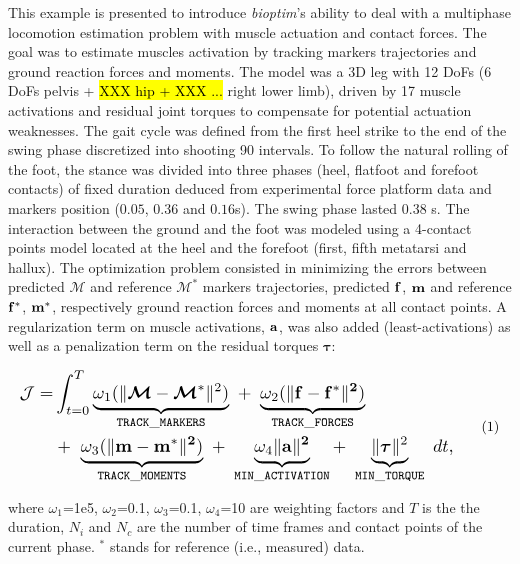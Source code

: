 This example is presented to introduce \textit{bioptim}'s ability to deal with a multiphase locomotion estimation problem with muscle actuation and contact forces.
The goal was to estimate muscles activation by tracking markers trajectories and ground reaction forces and moments. 
The model was a 3D leg with 12 DoFs (6 DoFs pelvis + \hl{XXX hip + XXX ... }right lower limb), driven by 17 muscle activations and residual joint torques to compensate for potential actuation weaknesses. 
The gait cycle was defined from the first heel strike to the end of the swing phase discretized into shooting 90 intervals. 
To follow the natural rolling of the foot, the stance was divided into three phases (heel, flatfoot and forefoot contacts) of fixed duration deduced from experimental force platform data and markers position ($0.05$, $0.36$ and $0.16$s).
The swing phase lasted 0.38 s. 
The interaction between the ground and the foot was modeled using a 4-contact points model located at the heel and the forefoot (first, fifth metatarsi and hallux).
The optimization problem consisted in minimizing the errors between predicted $\bm{\mathcal{M}}$ and reference $\bm{\mathcal{M}}^*$ markers trajectories, predicted $\bf{f}$, $\bf{m}$ and reference $\bf{f^*}$, $\bf{m^*}$, respectively ground reaction forces and moments at all contact points.
A regularization term on muscle activations, $\bf{a}$, was also added (least-activations) as well as a penalization term on the residual torques $\boldsymbol{\tau}$:

\[ 
\resizebox{0.9\columnwidth}{!}{$ 
\begin{aligned}
\mathcal{J} = &\int_{t=0}^{T}\underbrace{\omega_1(\|\bm{\mathcal{M}} - \bm{\mathcal{M}}^*\|^{2})}_{\mathtt{TRACK\_MARKERS}}~ 
+ ~ \underbrace{\omega_2(\|\bf{f} - \bf{f}^*\|^{2})}_{\mathtt{TRACK\_FORCES}}\\
&+ ~ \underbrace{\omega_3(\|\bf{m} - \bf{m}^*\|^{2})}_{\mathtt{TRACK\_MOMENTS}}~
+ ~ \underbrace{\omega_4\|\bf{a}\|^2}_{\mathtt{MIN\_ACTIVATION}}
+ ~ \underbrace{\|\boldsymbol{\tau}\|^2}_{\mathtt{MIN\_TORQUE}}~dt, 
\end{aligned}  
$}  
\addtag  
\label{eq:ocp_walk}  
\]

\noindent where $\omega_1$=1e5, $\omega_2$=0.1, $\omega_3$=0.1, $\omega_4$=10 are  weighting factors and $T$ is the the duration, $N_i$ and $N_c$ are the number of time frames and contact points of the current phase. $^*$ stands for reference (i.e., measured) data.\\

